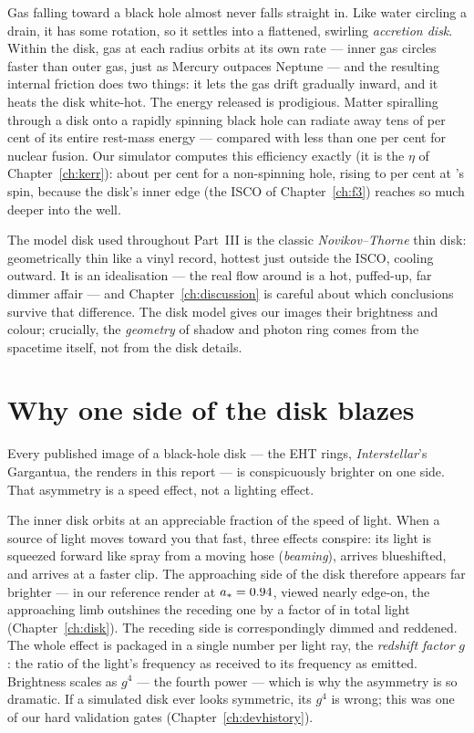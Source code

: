 Gas falling toward a black hole almost never falls straight in. Like
water circling a drain, it has some rotation, so it settles into a
flattened, swirling \emph{accretion disk}. Within the disk, gas at each
radius orbits at its own rate — inner gas circles faster than outer gas,
just as Mercury outpaces Neptune — and the resulting internal friction
does two things: it lets the gas drift gradually inward, and it heats
the disk white-hot. The energy released is prodigious. Matter spiralling
through a disk onto a rapidly spinning black hole can radiate away tens
of per cent of its entire rest-mass energy — compared with less than one
per cent for nuclear fusion. Our simulator computes this efficiency
exactly (it is the $\eta$ of Chapter~\ref{ch:kerr}): about
\EtaSchw{} per cent for a non-spinning hole, rising to
\EtaSgrA{} per cent at \sgra{}'s spin, because the disk's inner edge (the
ISCO of Chapter~\ref{ch:f3}) reaches so much deeper into the well.

The model disk used throughout Part~III is the classic
\emph{Novikov--Thorne} thin disk: geometrically thin like a vinyl record,
hottest just outside the ISCO, cooling outward. It is an idealisation —
the real flow around \sgra{} is a hot, puffed-up, far dimmer affair — and
Chapter~\ref{ch:discussion} is careful about which conclusions survive
that difference. The disk model gives our images their brightness and
colour; crucially, the \emph{geometry} of shadow and photon ring comes
from the spacetime itself, not from the disk details.

\section{Why one side of the disk blazes}

Every published image of a black-hole disk — the EHT rings,
\emph{Interstellar}'s Gargantua, the renders in this report — is
conspicuously brighter on one side. That asymmetry is a speed effect,
not a lighting effect.

The inner disk orbits at an appreciable fraction of the speed of light.
When a source of light moves toward you that fast, three effects
conspire: its light is squeezed forward like spray from a moving hose
(\emph{beaming}), arrives blueshifted, and arrives at a faster clip. The
approaching side of the disk therefore appears far brighter — in our
reference render at $a_* = 0.94$, viewed nearly edge-on, the
approaching limb outshines the receding one by a factor of
\BeamRatio{} in total light (Chapter~\ref{ch:disk}). The receding side is
correspondingly dimmed and reddened. The whole effect is packaged in a
single number per light ray, the \emph{redshift factor} $g$: the ratio of
the light's frequency as received to its frequency as emitted. Brightness
scales as $g^4$ — the fourth power — which is why the asymmetry is so
dramatic. If a simulated disk ever looks symmetric, its $g^4$ is wrong;
this was one of our hard validation gates
(Chapter~\ref{ch:devhistory}).

